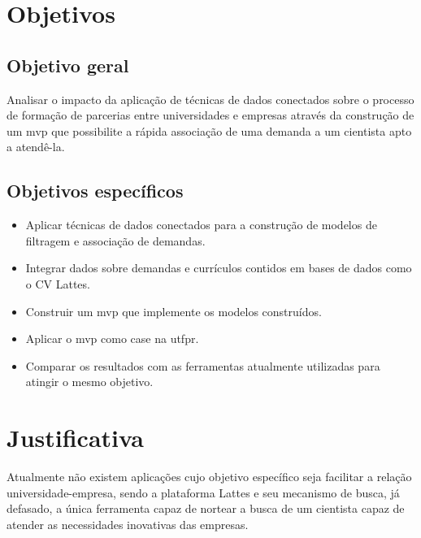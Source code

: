 \section{Objetivos}\label{sec:objetivos}

\subsection{Objetivo geral}\label{subsec:objetivoGeral}

Analisar o impacto da aplicação de técnicas de dados conectados sobre o processo de formação de parcerias entre universidades e empresas através da construção de um \gls{mvp} que possibilite a rápida associação de uma demanda a um cientista apto a atendê-la.

\subsection{Objetivos específicos}\label{subsec:objetivosEspecificos}

\begin{itemize}
    \item Aplicar técnicas de dados conectados para a construção de modelos de filtragem e associação de demandas.
    \item Integrar dados sobre demandas e currículos contidos em bases de dados como o CV Lattes.
    \item Construir um \gls{mvp} que implemente os modelos construídos.
    \item Aplicar o \gls{mvp} como case na \gls{utfpr}.
    \item Comparar os resultados com as ferramentas atualmente utilizadas para atingir o mesmo objetivo.
\end{itemize}

\section{Justificativa}\label{sec:justificativa}

Atualmente não existem aplicações cujo objetivo específico seja facilitar a relação universidade-empresa, sendo a plataforma Lattes e seu mecanismo de busca, já defasado, a única ferramenta capaz de nortear a busca de um cientista capaz de atender as necessidades inovativas das empresas.

